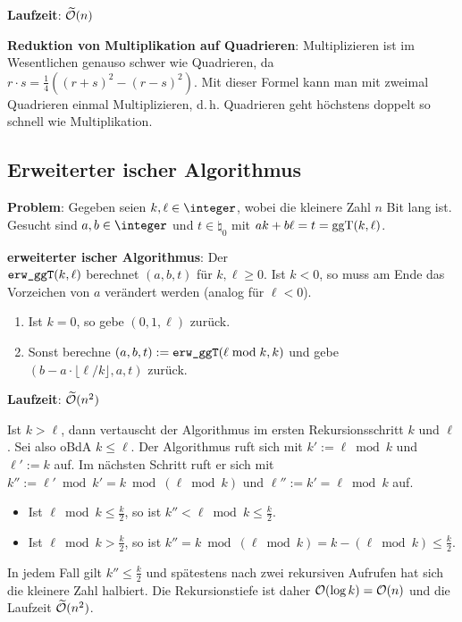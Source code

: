 \textbf{Laufzeit}:
$\widetilde{\mathcal{O}}(n)$

\linie

\textbf{Reduktion von Multiplikation auf Quadrieren}:
Multiplizieren ist im Wesentlichen genauso schwer wie Quadrieren,
da $r \cdot s = \frac{1}{4} ((r + s)^2 - (r - s)^2)$.
Mit dieser Formel kann man mit zweimal Quadrieren einmal Multiplizieren,
d.\,h. Quadrieren geht höchstens doppelt so schnell wie Multiplikation.

\subsection{%
    Erweiterter ischer Algorithmus%
}

\textbf{Problem}:
Gegeben seien $k, \ell \in \integer$, wobei die kleinere Zahl $n$ Bit lang ist.\\
Gesucht sind $a, b \in \integer$ und $t \in \natural_0$ mit
$ak + b\ell = t = \operatorname{ggT}(k, \ell)$.

\textbf{erweiterter ischer Algorithmus}:
Der \\
$\texttt{erw\_ggT}(k, \ell)$
berechnet $(a, b, t)$ für $k, \ell \ge 0$.
Ist $k < 0$, so muss am Ende das Vorzeichen von $a$ verändert werden
(analog für $\ell < 0$).
\begin{enumerate}
    \item
    Ist $k = 0$, so gebe $(0, 1, \ell)$ zurück.

    \item
    Sonst berechne $(a, b, t) := \texttt{erw\_ggT}(\ell \bmod k, k)$
    und gebe $(b - a \cdot \lfloor \ell/k \rfloor, a, t)$ zurück.
\end{enumerate}

\textbf{Laufzeit}:
$\widetilde{\mathcal{O}}(n^2)$

\begin{Beweis}
    Ist $k > \ell$, dann vertauscht der Algorithmus im ersten Rekursionsschritt $k$ und $\ell$.
    Sei also oBdA $k \le \ell$.
    Der Algorithmus ruft sich mit $k' := \ell \bmod k$ und $\ell' := k$ auf.
    Im nächsten Schritt ruft er sich mit $k'' := \ell' \bmod k' = k \bmod (\ell \bmod k)$ und
    $\ell'' := k' = \ell \bmod k$ auf.
    \begin{itemize}
        \item
        Ist $\ell \bmod k \le \frac{k}{2}$, so ist $k'' < \ell \bmod k \le \frac{k}{2}$.

        \item
        Ist $\ell \bmod k > \frac{k}{2}$, so ist
        $k'' = k \bmod (\ell \bmod k) = k - (\ell \bmod k) \le \frac{k}{2}$.
    \end{itemize}
    In jedem Fall gilt $k'' \le \frac{k}{2}$ und spätestens nach zwei rekursiven Aufrufen hat
    sich die kleinere Zahl halbiert.
    Die Rekursionstiefe ist daher $\mathcal{O}(\log k) = \mathcal{O}(n)$ und die Laufzeit $\widetilde{\mathcal{O}}(n^2)$.
\end{Beweis}

